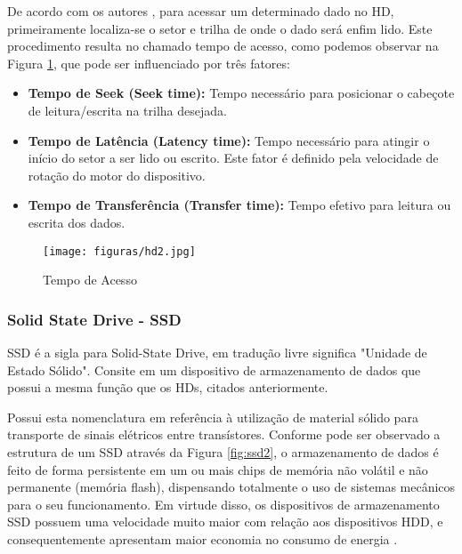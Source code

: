 De acordo com os autores \cite{tanenbaum1995sistemas}, para acessar um determinado dado no HD, primeiramente localiza-se o setor e trilha de onde o dado será enfim lido. Este procedimento resulta no chamado tempo de acesso, como podemos observar na  Figura \ref{fig:hd2}, que pode ser influenciado por três fatores: 

\begin{itemize}
\item \textbf{Tempo de Seek (Seek time):} Tempo necessário para posicionar o cabeçote de leitura/escrita na trilha desejada.

\item \textbf{Tempo de Latência (Latency time):} Tempo necessário para atingir o início do setor a ser lido ou escrito. Este fator é definido pela velocidade de rotação do motor do dispositivo.


\item \textbf{Tempo de Transferência (Transfer time):} Tempo efetivo para leitura ou escrita
dos dados.
\end{itemize}

\begin{figure}[htb]
	\caption{\label{fig:hd2}Tempo de Acesso}
	\begin{center}
	    \texttt{[image: figuras/hd2.jpg]}
	\end{center}
\end{figure}



\subsubsection{Solid State Drive - SSD}

SSD é a sigla para Solid-State Drive, em tradução livre significa "Unidade de Estado Sólido".  Consite em um dispositivo de armazenamento de dados que possui a mesma função que os HDs, citados anteriormente.

Possui esta nomenclatura em referência à utilização de material sólido para transporte de sinais elétricos entre transístores. Conforme pode ser observado a estrutura de um SSD através da Figura \ref{fig:ssd2}, o armazenamento de dados é feito de forma persistente em um ou mais chips de memória não volátil e não permanente (memória flash), dispensando totalmente o uso de sistemas mecânicos para o seu funcionamento. Em virtude disso, os dispositivos de armazenamento SSD possuem uma velocidade muito maior com relação aos dispositivos HDD, e consequentemente apresentam maior economia no consumo de energia \cite{ssd}.

